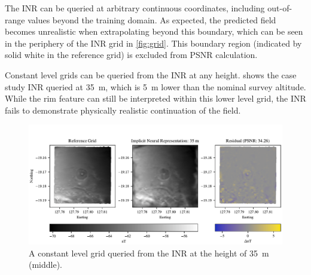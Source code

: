\documentclass[manuscript.tex]{subfiles}
\begin{document}
The INR can be queried at arbitrary continuous coordinates, including out-of-range values beyond the training domain.
As expected, the predicted field becomes unrealistic when extrapolating beyond this boundary, which can be seen in the periphery of the INR grid in \cref{fig:grid}.
This boundary region (indicated by solid white in the reference grid) is excluded from PSNR calculation.

Constant level grids can be queried from the INR at any height.
 shows the case study INR queried at \SI{35}{\m}, which is \SI{5}{\m} lower than the nominal survey altitude.
While the rim feature can still be interpreted within this lower level grid, the INR fails to demonstrate physically realistic continuation of the field.

\begin{figure}[hbt]
    \centering{}
    \includegraphics[width=1.0\linewidth]{fig/p3/P864_grid_comparison_35m.pdf}
    \caption[Grid prediction outside the nominal altitude]{A constant level grid queried from the INR at the height of \SI{35}{\m} (middle).}
    \label{fig:grid35}
\end{figure}


\end{document}
